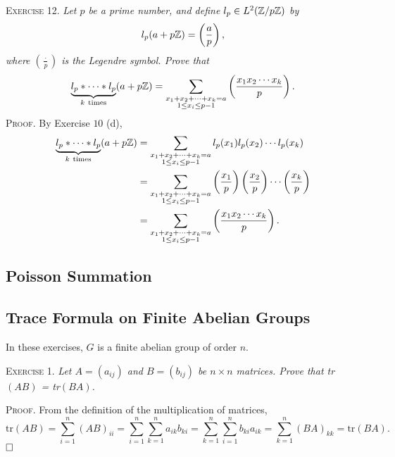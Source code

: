 \documentclass[11pt, leqno]{article}
\newcommand{\done}{\ensuremath{\hfill\square}}
\begin{document}
\textsc{Exercise 12}. \emph{Let $p$ be a prime number, and define $l_p \in L^2(\mathbb{Z}/p\mathbb{Z})$ by 
\begin{displaymath}
l_p(a + p\mathbb{Z}) = \left( \frac{a}{p} \right),
\end{displaymath}
where $\left( \frac{\cdot}{p} \right)$ is the Legendre symbol. Prove that 
\begin{displaymath}
  \underbrace{l_p * \cdots * l_p}_{k\ \text{times}}(a + p\Z) = \sum_{\substack {x_1 + x_2 + \cdots + x_k = a\\ 1 \leq x_i \leq p-1}} \left( \frac{x_1x_2\cdots x_k}{p} \right).
\end{displaymath}}\textsc{Proof}. By Exercise $10$ (d), 
\begin{align*}
  \underbrace{l_p * \cdots * l_p}_{k\ \text{times}}(a + p\mathbb{Z}) &= \sum_{\substack {x_1 + x_2 + \cdots + x_k = a\\ 1 \leq x_i \leq p-1}} l_p( x_1 ) l_p(x_2) \cdots l_p(x_k) \\
                                                             &= \sum_{\substack {x_1 + x_2 + \cdots + x_k = a\\ 1 \leq x_i \leq p-1}} \left( \frac{x_1}{p} \right) \left( \frac{x_2}{p} \right) \cdots \left( \frac{x_k}{p} \right) \\
  &= \sum_{\substack {x_1 + x_2 + \cdots + x_k = a\\ 1 \leq x_i \leq p-1}} \left( \frac{x_1x_2\cdots x_k}{p} \right).
\end{align*}

\subsection{Poisson Summation}

\subsection{Trace Formula on Finite Abelian Groups}

In these exercises, $G$ is a finite abelian group of order $n$.

\textsc{Exercise 1}. \emph{Let $A = (a_{ij})$ and $B = (b_{ij})$ be $n\times n$ matrices. Prove that tr$(AB)$ = tr$(BA)$.}

\textsc{Proof}. From the definition of the multiplication of matrices, 
\begin{displaymath}
\text{tr}(AB) = \sum_{i=1}^{n}(AB)_{ii} = \sum_{i=1}^{n}\sum_{k=1}^{n} a_{ik}b_{ki} = \sum_{k=1}^n \sum_{i=1}^n b_{ki} a_{ik} = \sum_{k=1}^n (BA)_{kk} = \text{tr}(BA).
\end{displaymath}\done
\end{document}
